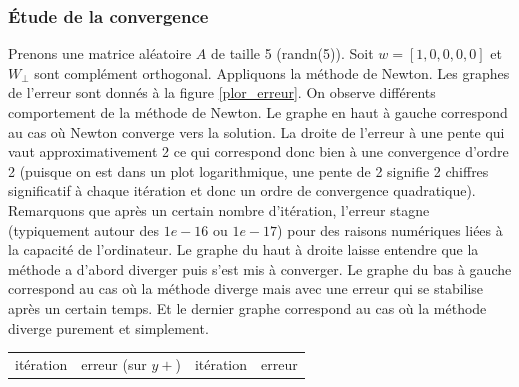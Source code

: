 \subsubsection{Étude de la convergence}
Prenons une matrice aléatoire $A$ de taille 5 (randn(5)). Soit $w=[1,0,0,0,0]$ et $W_{\bot}$ sont complément orthogonal. Appliquons la méthode de Newton. Les graphes de l'erreur sont donnés à la figure \ref{plor_erreur}. On observe différents comportement de la méthode de Newton. Le graphe en haut à gauche correspond au cas où Newton converge vers la solution. La droite de l'erreur à une pente qui vaut approximativement 2 ce qui correspond donc bien à une convergence d'ordre 2 (puisque on est dans un plot logarithmique, une pente de 2 signifie 2 chiffres significatif à chaque itération et donc un ordre de convergence quadratique). Remarquons que après un certain nombre d'itération, l'erreur stagne (typiquement autour des $1e-16$ ou $1e-17$) pour des raisons numériques liées à la capacité de l'ordinateur. Le graphe du haut à droite laisse entendre que la méthode a d'abord diverger puis s'est mis à converger. Le graphe du bas à gauche correspond au cas où la méthode diverge mais avec une erreur qui se stabilise après un certain temps. Et le dernier graphe correspond au cas où la méthode diverge purement et simplement.
\begin{table}
\centering
\begin{tabular}{cccc}
itération & erreur (sur $y+$) & itération & erreur\\
\end{tabular}
\end{table}  

